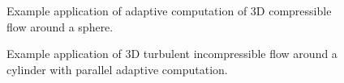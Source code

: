\begin{figure}[!h]
\caption{
Example application of adaptive computation of 3D compressible flow
around a sphere.  }
\label{fig:compr3D}
\end{figure}

\begin{figure}[!h]
\caption{
Example application of 3D turbulent incompressible flow around a
cylinder with parallel adaptive computation. }
\label{fig:parcyl3D}
\end{figure}


\label{chapter:implementation:unicorn}



